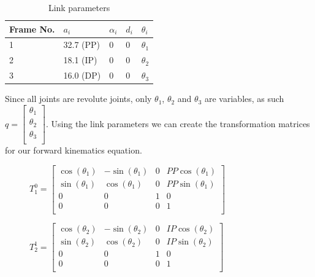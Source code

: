 \documentclass{article}
\begin{document}
\begin{table}[h!]
\centering
\caption{Link parameters}
\label{my-label}
\begin{tabular}{lllll}
\hline
Frame No. & \(a_i\) & \(\alpha_i\) & \(d_i\) & \(\theta_i\) \\\hline
1 & 32.7 (PP) & 0      & 0  & \(\theta_1\) \\
2 & 18.1 (IP) & 0      & 0  & \(\theta_2\) \\
3 & 16.0 (DP) & 0      & 0  & \(\theta_3\) \\\hline
\end{tabular}
\end{table}

Since all joints are revolute joints, only \(\theta_1\),  \(\theta_2\) and \(\theta_3\) are variables, as such \(q = \begin{bmatrix}\theta_1\\\theta_2\\\theta_3\\\end{bmatrix}\). Using the link parameters we can create the transformation matrices for our forward kinematics equation.\\

\begin{figure}[h!]
\centering
\(T_1^0 = \begin{bmatrix}
       		\cos(\theta_1) & -\sin(\theta_1) & 0 & PP\cos(\theta_1) \\[0.3em]
       		\sin(\theta_1) & \cos(\theta_1) & 0 & PP\sin(\theta_1) \\[0.3em]
       		0 & 0 & 1 & 0 \\[0.3em]
       		0 & 0 & 0 & 1 \\[0.3em]
     \end{bmatrix}\)
\end{figure}

\begin{figure}[h!]
\centering
\(T_2^1 = \begin{bmatrix}
       		\cos(\theta_2) & -\sin(\theta_2) & 0 & IP\cos(\theta_2) \\[0.3em]
       		\sin(\theta_2) & \cos(\theta_2) & 0 & IP\sin(\theta_2) \\[0.3em]
       		0 & 0 & 1 & 0 \\[0.3em]
       		0 & 0 & 0 & 1 \\[0.3em]
     \end{bmatrix}\)
\end{figure}
\end{document}
